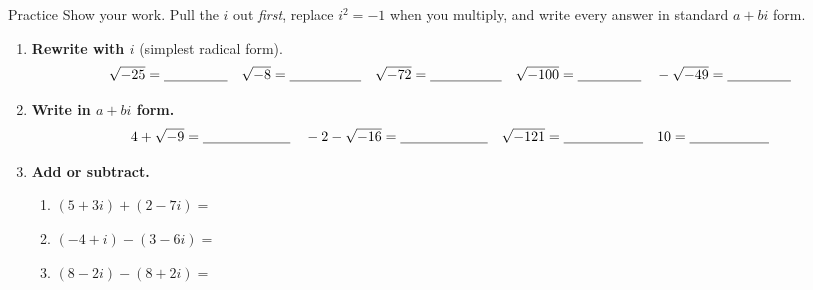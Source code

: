 \documentclass[10pt]{article}
\begin{document}

\vspace{0.10in}

\begin{notesbox}{Practice}
Show your work. Pull the $i$ out \emph{first}, replace $i^2=-1$ when you multiply, and write every answer
in standard $a+bi$ form.

\begin{enumerate}[leftmargin=1.9em, itemsep=10pt]
  \item \textbf{Rewrite with $i$} (simplest radical form).
    \[ \sqrt{-25}=\blank{1.6cm} \quad \sqrt{-8}=\blank{1.8cm} \quad \sqrt{-72}=\blank{1.8cm} \quad \sqrt{-100}=\blank{1.6cm} \quad -\sqrt{-49}=\blank{1.6cm} \]

  \item \textbf{Write in $a+bi$ form.}
    \[ 4+\sqrt{-9}=\blank{2.2cm} \quad -2-\sqrt{-16}=\blank{2.2cm} \quad \sqrt{-121}=\blank{2.0cm} \quad 10=\blank{2.0cm} \]

  \item \textbf{Add or subtract.}
    \begin{enumerate}[label=(\alph*), leftmargin=1.9em, itemsep=5pt]
      \item $(5+3i)+(2-7i)=$ \blank{3.0cm}
      \item $(-4+i)-(3-6i)=$ \blank{3.0cm}
      \item $(8-2i)-(8+2i)=$ \blank{3.0cm}
    \end{enumerate}


\end{enumerate}
\end{notesbox}
\end{document}
